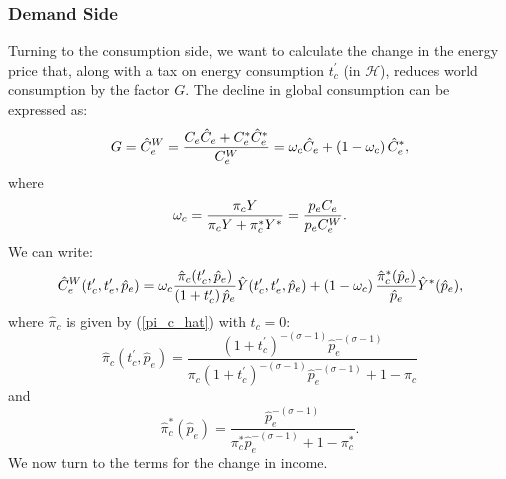 \documentclass[notitlepage,12pt]{article}
\begin{document}
\subsubsection{Demand Side}

Turning to the consumption side, we want to calculate the change in the
energy price that, along with a tax on energy consumption $t_{c}^{\prime }$
(in $\mathcal{H}$), reduces world consumption by the factor $G$. The decline
in global consumption can be expressed as:%
\begin{equation*}
G=\hat{C}_{e}^{W}=\frac{C_{e}\hat{C}_{e}+C_{e}^{\ast }\hat{C}_{e}^{\ast }}{%
C_{e}^{W}}=\omega _{c}\hat{C}_{e}+\left( 1-\omega _{c}\right) \hat{C}%
_{e}^{\ast },
\end{equation*}%
where%
\begin{equation*}
\omega _{c}=\frac{\pi _{c}Y}{\pi _{c}Y+\pi _{c}^{\ast }Y^{\ast }}=\frac{%
p_{e}C_{e}}{p_{e}C_{e}^{W}}.
\end{equation*}%
We can write:%
\begin{equation}
\hat{C}_{e}^{W}(t_{c}^{\prime },t_{e}^{\prime },\hat{p}_{e})=\omega _{c}%
\frac{\hat{\pi}_{c}(t_{c}^{\prime },\hat{p}_{e})}{\left( 1+t_{c}^{\prime
}\right) \hat{p}_{e}}\hat{Y}(t_{c}^{\prime },t_{e}^{\prime },\hat{p}%
_{e})+\left( 1-\omega _{c}\right) \frac{\hat{\pi}_{c}^{\ast }(\hat{p}_{e})}{%
\hat{p}_{e}}\hat{Y}^{\ast }(\hat{p}_{e}),  \label{demand side}
\end{equation}%
where $\hat{\pi}_{c}$ is given by (\ref{pi_c_hat}) with $t_{c}=0$:%
\begin{equation*}
\hat{\pi}_{c}(t_{c}^{\prime },\hat{p}_{e})=\frac{\left( 1+t_{c}^{\prime
}\right) ^{-(\sigma -1)}\hat{p}_{e}^{-(\sigma -1)}}{\pi _{c}\left(
1+t_{c}^{\prime }\right) ^{-(\sigma -1)}\hat{p}_{e}^{-(\sigma -1)}+1-\pi _{c}%
}
\end{equation*}%
and%
\begin{equation*}
\hat{\pi}_{c}^{\ast }(\hat{p}_{e})=\frac{\hat{p}_{e}^{-(\sigma -1)}}{\pi
_{c}^{\ast }\hat{p}_{e}^{-(\sigma -1)}+1-\pi _{c}^{\ast }}.
\end{equation*}%
We now turn to the terms for the change in income.
\end{document}
